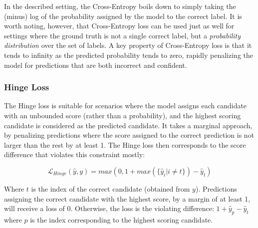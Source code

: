 In the described setting, the Cross-Entropy boils down to simply taking the (minus) log of the probability assigned by the model to the correct label. It is worth noting, however, that Cross-Entropy loss can be used just as well for settings where the ground truth is not a single correct label, but a \emph{probability distribution} over the set of labels. 
A key property of Cross-Entropy loss is that it tends to infinity as the predicted probability tends to zero, rapidly penalizing the model for predictions that are both incorrect and confident.

\subsubsection{Hinge Loss}
The Hinge loss is suitable for scenarios where the model assigns each candidate with an unbounded score (rather than a probability), and the highest scoring candidate is considered as the predicted candidate. It takes a marginal approach, by penalizing predictions where the score assigned to the correct prediction is not larger than the rest by at least 1. The Hinge loss then corresponds to the score difference that violates this constraint mostly:

\begin{equation}
    \mathcal{L}_{Hinge}(\hat{y}, y) = max(0, 1 + max(\{\hat{y}_{i} | i \neq t\}) - \hat{y}_t)    \label{hingeloss}
\end{equation}

Where $t$ is the index of the correct candidate (obtained from $y$). Predictions assigning the correct candidate with the highest score, by a margin of at least 1, will receive a loss of 0. Otherwise, the loss is the violating difference:  $ 1 + \hat{y}_p - \hat{y}_t $ where $p$ is the index corresponding to the highest scoring candidate.


